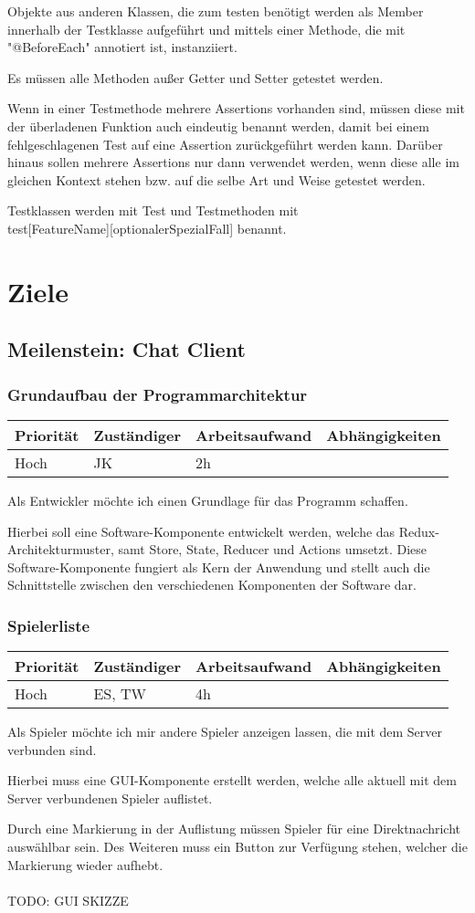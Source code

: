 \documentclass[a4paper]{scrreprt}
\newenvironment{requirement}[5] {
	\subsection{#1}
	\begin{tabularx}{\textwidth}{|X|l|X|X|}
		\hline
		Priorität & Zuständiger & Arbeitsaufwand & Abhängigkeiten \\
		\hline
		#2 & #3 & #4 & #5 \\
		\hline
	\end{tabularx}
	}{
	\newpage
	}
\begin{document}
Objekte aus anderen Klassen, die zum testen benötigt werden als Member innerhalb der Testklasse aufgeführt und mittels einer Methode, die mit "@BeforeEach" annotiert ist, instanziiert.

Es müssen alle Methoden außer \glqq Getter\grqq{} und \glqq Setter\grqq{} getestet werden.

Wenn in einer Testmethode mehrere Assertions vorhanden sind, müssen diese mit der überladenen Funktion auch eindeutig benannt werden, damit bei einem fehlgeschlagenen Test auf eine Assertion zurückgeführt werden kann. Darüber hinaus sollen mehrere Assertions nur dann verwendet werden, wenn diese alle im gleichen Kontext stehen bzw. auf die selbe Art und Weise getestet werden.

Testklassen werden mit \glqq[KlassenName]Test\grqq{} und Testmethoden mit \\ \glqq test[FeatureName][optionalerSpezialFall]\grqq{} benannt.





\chapter{Ziele}
\section{Meilenstein: Chat Client}


\begin{requirement}{Grundaufbau der Programmarchitektur}{Hoch}{JK}{2h}{}

\begin{center}
	Als Entwickler möchte ich einen Grundlage für das Programm schaffen.
\end{center}

Hierbei soll eine Software-Komponente entwickelt werden, welche das Redux-Architekturmuster, samt \glqq Store\grqq{}, \glqq State\grqq{}, \glqq Reducer\grqq{} und \glqq Actions\grqq{} umsetzt. Diese Software-Komponente fungiert als Kern der Anwendung und stellt auch die Schnittstelle zwischen den verschiedenen Komponenten der Software dar.

\end{requirement}


\begin{requirement}{Spielerliste}{Hoch}{ES, TW}{4h}{}

\begin{center}
Als Spieler möchte ich mir andere Spieler anzeigen lassen, die mit dem Server verbunden sind.
\end{center}

Hierbei muss eine GUI-Komponente erstellt werden, welche alle aktuell mit dem Server verbundenen Spieler auflistet.

Durch eine Markierung in der Auflistung müssen Spieler für eine Direktnachricht auswählbar sein. Des Weiteren muss ein Button zur Verfügung stehen, welcher die Markierung wieder aufhebt.
\\
\\
TODO: GUI SKIZZE

\end{requirement}
\end{document}
